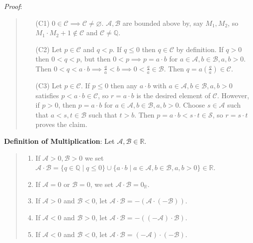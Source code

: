 \documentclass[11pt]{article}
\begin{document}
\emph{Proof}:
\begin{quote}\vspace{-0.3cm}
	\begin{enumerate}
	\item[(C1)] $0 \in \mathcal{C} \implies \mathcal{C} \neq \varnothing$. $\mathcal{A}, \mathcal{B}$ are bounded above by, say $M_1, M_2$, so $M_1 \cdot M_2 + 1 \notin \mathcal{C}$ and $\mathcal{C} \neq \mathbb{Q}$.
	\item[(C2)] Let $p \in \mathcal{C}$ and $q < p$. If $q \leq 0$ then $q \in \mathcal{C}$ by definition. If $q > 0$ then $0 < q < p$, but then $0 < p \implies p = a \cdot b$ for $a \in \mathcal{A}, b \in \mathcal{B}, a, b > 0$. Then $0 < q < a \cdot b \implies \frac{q}{a} < b \implies 0 < \frac{q}{a} \in \mathcal{B}$. Then $q = a(\frac{q}{a}) \in \mathcal{C}$.
	\item[(C3)] Let $p \in \mathcal{C}$. If $p \leq 0$ then any $a \cdot b$ with $a \in \mathcal{A}, b \in \mathcal{B}, a,b > 0$ satisfies $p < a \cdot b \in \mathcal{C}$, so $r = a \cdot b$ is the desired element of $\mathcal{C}$. However, if $p > 0$, then $p = a \cdot b$ for $a \in \mathcal{A}, b \in \mathcal{B}, a,b > 0$. Choose $s \in \mathcal{A}$ such that $a < s, t \in \mathcal{B}$ such that $t > b$. Then $p = a \cdot b < s \cdot t \in \mathcal{S}$, so $r = s \cdot t$ proves the claim.
	\end{enumerate}
\end{quote}

\textbf{Definition of Multiplication}: Let $\mathcal{A}, \mathcal{B} \in \mathbb{R}$.
\begin{quote}\vspace{-0.3cm}
	\begin{enumerate}
	\item If $\mathcal{A} > 0, \mathcal{B} > 0$ we set $\mathcal{A} \cdot \mathcal{B} = \{q \in \mathbb{Q} \;|\; q \leq 0\} \cup \{a \cdot b \;|\; a \in \mathcal{A}, b \in \mathcal{B}, a, b > 0\} \in \mathbb{R}$.
	\item If $\mathcal{A} = 0$ or $\mathcal{B} = 0$, we set $\mathcal{A} \cdot \mathcal{B} = 0_\mathbb{R}$.
	\item If $\mathcal{A} > 0$ and $\mathcal{B} < 0$, let $\mathcal{A} \cdot \mathcal{B} = - (\mathcal{A} \cdot (-\mathcal{B}))$.
	\item If $\mathcal{A} < 0$ and $\mathcal{B} > 0$, let $\mathcal{A} \cdot \mathcal{B} = -((-\mathcal{A}) \cdot \mathcal{B})$.
	\item If $\mathcal{A} < 0$ and $\mathcal{B} < 0$, let $\mathcal{A} \cdot \mathcal{B} = (-\mathcal{A}) \cdot (-\mathcal{B})$.
	\end{enumerate}
\end{quote}
\end{document}
